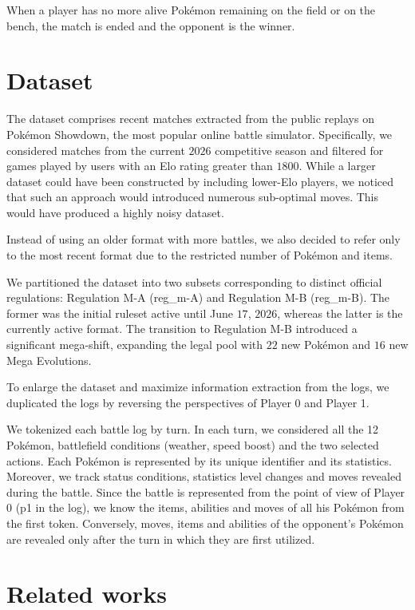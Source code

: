 \documentclass{article}
\begin{document}
When a player has no more alive Pokémon remaining on the field or on the bench, the match is ended and the opponent is the winner. 
\section{Dataset}
The dataset comprises recent matches extracted from the public replays on Pokémon Showdown, the most popular online battle simulator. Specifically, we considered matches from the current $2026$ competitive season and filtered for games played by users with an Elo rating greater than $1800$. 
While a larger dataset could have been constructed by including lower-Elo players, we noticed that such an approach would introduced numerous sub-optimal moves. This would have produced a highly noisy dataset.

Instead of using an older format with more battles, we also decided to refer only to the most recent format due to the restricted number of Pokémon and items.

We partitioned the dataset into two subsets corresponding to distinct official regulations: Regulation M-A (reg\_m-A) and Regulation M-B (reg\_m-B). The former was the initial ruleset active until June $17$, $2026$, whereas the latter is the currently active format. The transition to Regulation M-B introduced a significant mega-shift, expanding the legal pool with $22$ new Pokémon and $16$ new Mega Evolutions.

To enlarge the dataset and maximize information extraction from the logs, we duplicated the logs by reversing the perspectives of Player 0 and Player 1.

We tokenized each battle log by turn. In each turn, we considered all the 12 Pokémon, battlefield conditions (weather, speed boost) and the two selected actions. Each Pokémon is represented by its unique identifier and its statistics. Moreover, we track status conditions, statistics level changes and moves revealed during the battle. Since the battle is represented from the point of view of Player 0 (p1 in the log), we know the items, abilities and moves of all his Pokémon from the first token. Conversely, moves, items and abilities of the opponent's Pokémon are revealed only after the turn in which they are first utilized.    



\section{Related works}
\end{document}
